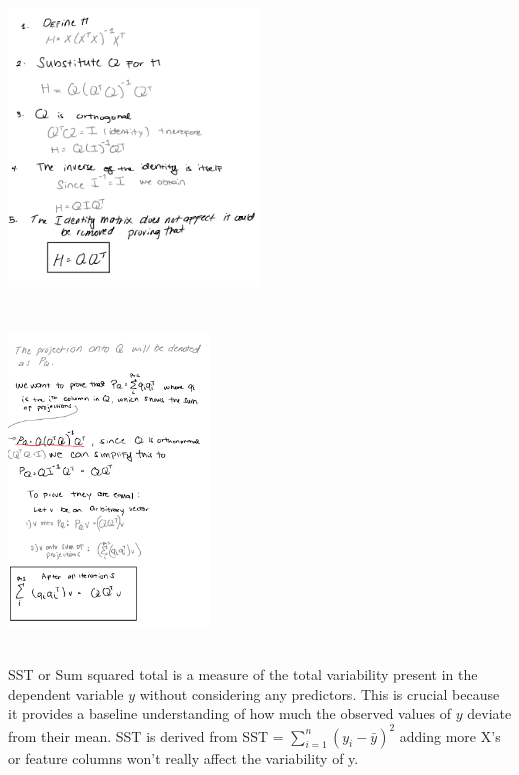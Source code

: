 \documentclass[12pt]{article}
\begin{document}
\begin{enumerate}
 \\ 
\includegraphics[width=0.5\textwidth]{2k.png} \\ \\ 



 \\
\includegraphics[width=0.4\textwidth]{2i.png}

 \\ 
SST or Sum squared total is a measure of the total variability present in the dependent variable \(y\) without considering any predictors. This is crucial because it provides a baseline understanding of how much the observed values of \(y\) deviate from their mean. SST is derived from SST =  \( \sum\limits_{i=1}^n (y_i - \bar{y})^2 \) adding more X's or feature columns won't really affect the variability of y. 


\end{enumerate}
\end{document}
